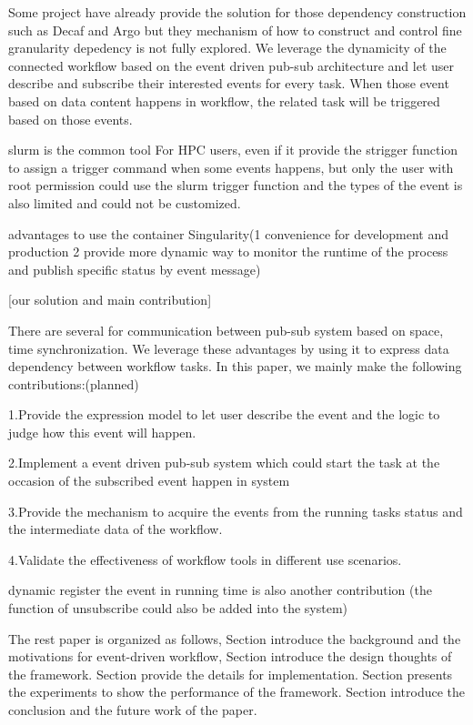 Some project have already provide the solution for those dependency construction such as Decaf \cite{dreher2017decaf} and Argo\cite{perarnau2015distributed} but they mechanism of how to construct and control fine granularity depedency is not fully explored. We leverage the dynamicity of the connected workflow based on the event driven pub-sub architecture and let user describe and subscribe their interested events for every task. When those event based on data content happens in workflow, the related task will be triggered based on those events. 

slurm is the common tool For HPC users,  even if it provide the strigger function to assign a trigger command when some events happens\cite{slurmtrigure}, but only the user with root permission could use the slurm trigger function and the types of the event is also limited and could not be customized.

advantages to use the container Singularity(1 convenience for development and production 2 provide more dynamic way to monitor the runtime of the process and publish specific status by event message)

[our solution and main contribution]

There are several for communication between pub-sub system based on space, time synchronization\cite{eugster2003many}. We leverage these advantages by using it to express data dependency between workflow tasks. In this paper, we mainly make the following contributions:(planned)

1.Provide the expression model to let user describe the event and the logic to judge how this event will happen.

2.Implement a event driven pub-sub system which could start the task at the occasion of the subscribed event happen in system

3.Provide the mechanism to acquire the events from the running tasks status and the intermediate data of the workflow.

4.Validate the effectiveness of workflow tools in different use scenarios.

dynamic register the event in running time is also another contribution (the function of unsubscribe could also be added into the system)



The rest paper is organized as follows, Section \uppercase\expandafter{} introduce the background and the motivations for event-driven workflow, Section \uppercase\expandafter{} introduce the design thoughts of the framework. Section \uppercase\expandafter{} provide the details for implementation. Section \uppercase\expandafter{} presents the experiments to show the performance of the framework. Section \uppercase\expandafter{} introduce the conclusion and the future work of the paper.
